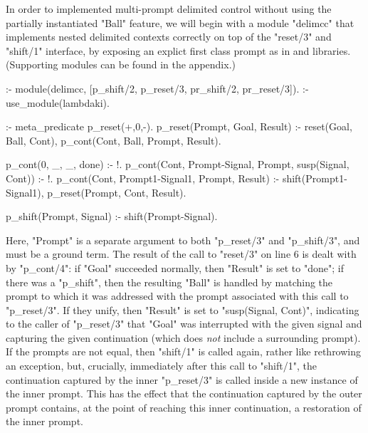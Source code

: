 In order to implemented multi-prompt delimited control without using the partially instantiated
"Ball" feature, we will begin with a module "delimcc" that implements nested delimited contexts
correctly on top of the "reset/3" and "shift/1" interface, by exposing an explict first class prompt
as in  and  libraries. 
(Supporting modules can be found in the appendix.)
\begin{prolog-framed}[name=delimcc]
  :- module(delimcc, [p_shift/2, p_reset/3, pr_shift/2, pr_reset/3]).
  :- use_module(lambdaki).

  :- meta_predicate p_reset(+,0,-).
  p_reset(Prompt, Goal, Result) :-
     reset(Goal, Ball, Cont),
     p_cont(Cont, Ball, Prompt, Result).

  p_cont(0, _, _, done) :- !.
  p_cont(Cont, Prompt-Signal, Prompt, susp(Signal, Cont)) :- !.
  p_cont(Cont, Prompt1-Signal1, Prompt, Result) :-
     shift(Prompt1-Signal1),
     p_reset(Prompt, Cont, Result).

  p_shift(Prompt, Signal) :- shift(Prompt-Signal).
\end{prolog-framed}
Here, "Prompt" is a separate argument to both "p_reset/3" and "p_shift/3", and must be a
ground term. The result of the call to "reset/3" on line 6 is dealt with by "p_cont/4": if "Goal" succeeded normally,
then "Result" is set to "done"; if there was a "p_shift", then the resulting
"Ball" is handled by matching the prompt to which it was addressed with the prompt associated with
this call to "p_reset/3". If they unify, then "Result" is set to "susp(Signal, Cont)",
indicating to the caller of "p_reset/3" that "Goal" was interrupted with the given signal
and capturing the given continuation (which does \emph{not} include a surrounding prompt).
If the prompts are not equal, then "shift/1" is called again, rather like rethrowing an exception,
but, crucially, immediately after this call to "shift/1", the continuation captured by the
inner "p_reset/3" is called inside a new instance of the inner prompt. This has the effect that
the continuation captured by the outer prompt contains, at the point of reaching this inner
continuation, a restoration of the inner prompt.

